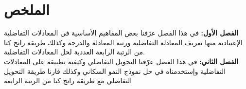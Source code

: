 \chapter*{الملخص}
\textbf{الفصل الأول:} في هذا الفصل عرّفنا بعض المفاهيم الأساسية في المعادلات التفاضلية الإعتيادية منها تعريف المعادلة التفاضلية ورتبة المعادلة والدرجة وكذلك طريقة رانج كتا من الرتبة الرابعة العددية لحل المعادلات التفاضلية.\\[10pt]
\textbf{الفصل الثاني:} في هذا الفصل عرّفنا التحويل التفاضلي وكيفية تطبيقه على المعادلات التفاضلية وإستخدمناه في حل نموذج النمو السكاني وكذلك قارنا طريقة التحويل التفاضلي مع طريقة رانج كتا من الرتبة الرابعة